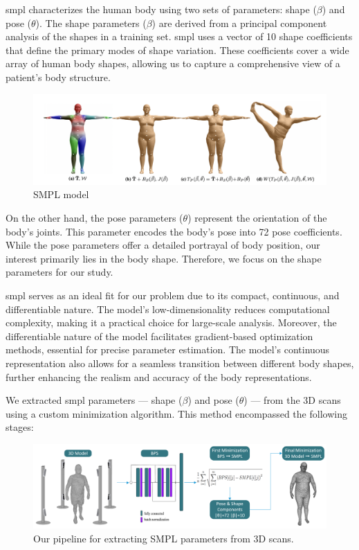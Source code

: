 \gls{smpl} characterizes the human body using two sets of parameters: shape ($\beta$)
and pose ($\theta$). The shape parameters ($\beta$) are derived from a
principal component analysis of the shapes in a training set. \gls{smpl} uses a
vector of 10 shape coefficients that define the primary modes of shape
variation. These coefficients cover a wide array of human body shapes, allowing
us to capture a comprehensive view of a patient's body structure.

\begin{figure}[H]
	\centering
	\includegraphics[width=\textwidth]{files/SMPL_formulation}
	\caption{SMPL model \citep{meshcapade}}
	\label{fig:SMPL_formulation}
\end{figure}

On the other hand, the pose parameters ($\theta$) represent the orientation of
the body's joints. This parameter encodes the body's pose into 72 pose
coefficients. While the pose parameters offer a detailed portrayal of body
position, our interest primarily lies in the body shape. Therefore, we focus on
the shape parameters for our study.

\gls{smpl} serves as an ideal fit for our problem due to its compact, continuous, and
differentiable nature. The model's low-dimensionality reduces computational
complexity, making it a practical choice for large-scale analysis. Moreover,
the differentiable nature of the model facilitates gradient-based optimization
methods, essential for precise parameter estimation. The model's continuous
representation also allows for a seamless transition between different body
shapes, further enhancing the realism and accuracy of the body representations.

We extracted \gls{smpl} parameters — shape ($\beta$) and pose ($\theta$) — from
the 3D scans using a custom minimization algorithm. This method encompassed the
following stages:

\begin{figure}[H]
	\centering
	\includegraphics[width=\textwidth]{files/pipeline_smpl.png}
	\caption{Our pipeline for extracting SMPL parameters from 3D scans.}
\end{figure}


